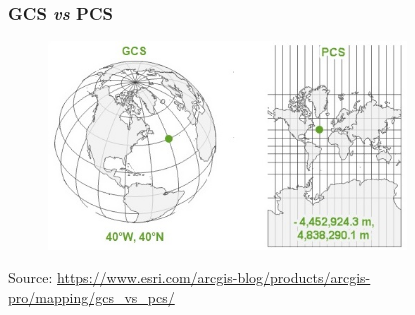 \documentclass[11pt]{beamer}
\begin{document}
\begin{frame}
\frametitle{GCS \emph{vs} PCS}
\begin{figure}
\includegraphics[width=9.5cm]{GCS_PCS.jpg}
\end{figure}
\tiny{Source: \url{https://www.esri.com/arcgis-blog/products/arcgis-pro/mapping/gcs_vs_pcs/}}
\end{frame}
\end{document}
